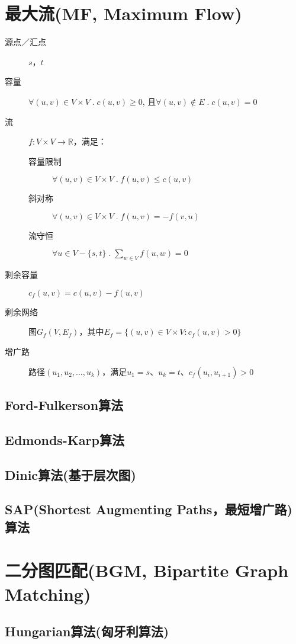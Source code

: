 \section{最大流(MF, Maximum Flow)}
\begin{description}
\item[源点／汇点] $s$，$t$
\item[容量] $\forall (u, v)  \in V \times V \;.\; c(u, v) \geqslant 0$, 且$\forall (u, v) \not\in E\;.\; c(u,v) = 0$
\item[流] $f:V \times V \rightarrow \mathbb{R} $，满足：
\begin{description}
\item[容量限制] $\forall (u, v) \in V \times V \;.\; f(u, v) \leqslant c(u, v) $
\item[斜对称] $\forall (u, v) \in V \times V \;.\; f(u, v) = -f(v, u)$
\item[流守恒] $\forall u \in V-\{s, t\} \;.\;\sum_{w \in V} f(u, w) = 0$
\end{description}
\item[剩余容量] $c_f(u,v) = c(u,v) - f(u,v)$
\item[剩余网络] 图$G_f(V, E_f)$，其中$E_f = \{(u,v) \in V \times V : c_f(u, v) > 0\}$
\item[增广路] 路径$(u_1, u_2, \dots, u_k)$，满足$u_1 = s$、$u_k = t$、$c_f(u_i, u_{i+1}) > 0$
\end{description}
\subsection{Ford-Fulkerson算法}
\subsection{Edmonds-Karp算法}
\subsection{Dinic算法(基于层次图)}
\subsection{SAP(Shortest Augmenting Paths，最短增广路)算法}

\section{二分图匹配(BGM, Bipartite Graph Matching)}
\subsection{Hungarian算法(匈牙利算法)}
